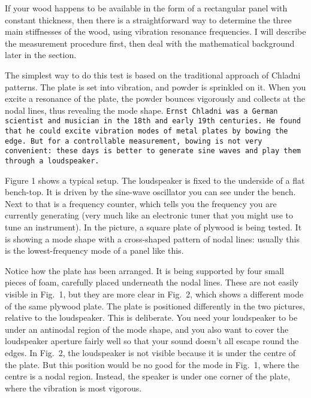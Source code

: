   If your wood happens to be available in the form of a rectangular panel with 
  constant thickness, then there is a straightforward way to determine the 
  three main stiffnesses of the wood, using vibration resonance frequencies. I 
  will describe the measurement procedure first, then deal with the 
  mathematical background later in the section. 

  The simplest way to do this test is based on the traditional approach of 
  Chladni patterns. The plate is set into vibration, and powder is sprinkled on 
  it. When you excite a resonance of the plate, the powder bounces vigorously 
  and collects at the nodal lines, thus revealing the mode shape. \tt{}Ernst 
  Chladni \rm{}was a German scientist and musician in the 18th and early 19th 
  centuries. He found that he could excite vibration modes of metal plates by 
  bowing the edge. But for a controllable measurement, bowing is not very 
  convenient: these days is better to generate sine waves and play them through 
  a loudspeaker. 

  Figure 1 shows a typical setup. The loudspeaker is fixed to the underside of 
  a flat bench-top. It is driven by the sine-wave oscillator you can see under 
  the bench. Next to that is a frequency counter, which tells you the frequency 
  you are currently generating (very much like an electronic tuner that you 
  might use to tune an instrument). In the picture, a square plate of plywood 
  is being tested. It is showing a mode shape with a cross-shaped pattern of 
  nodal lines: usually this is the lowest-frequency mode of a panel like this. 


  Notice how the plate has been arranged. It is being supported by four small 
  pieces of foam, carefully placed underneath the nodal lines. These are not 
  easily visible in Fig.\ 1, but they are more clear in Fig.\ 2, which shows a 
  different mode of the same plywood plate. The plate is positioned differently 
  in the two pictures, relative to the loudspeaker. This is deliberate. You 
  need your loudspeaker to be under an antinodal region of the mode shape, and 
  you also want to cover the loudspeaker aperture fairly well so that your 
  sound doesn’t all escape round the edges. In Fig.\ 2, the loudspeaker is not 
  visible because it is under the centre of the plate. But this position would 
  be no good for the mode in Fig.\ 1, where the centre is a nodal region. 
  Instead, the speaker is under one corner of the plate, where the vibration is 
  most vigorous. 

